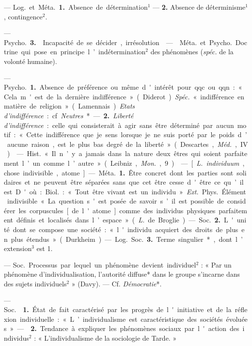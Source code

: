 \begin{itemize}[leftmargin=1cm, label=, itemsep=1pt]
 — \si{Log.} et \si{Méta.} {\bf 1.} Absence de détermination$^1$
—  {\bf 2.} Absence de déterminisme$^1$, contingence$^2$.

— \si{Psycho.} {\bf 3.}  Incapacité de se décider,
irrésolution.

 —  \si{Méta.} et \si{Psycho.} Doctrine qui
pose en principe l’indétermination$^2$ des phénomènes ({\it spéc.} de la
volonté humaine).

 — \si{Psycho.} {\bf 1.} Absence de préférence ou même
d'intérêt pour qqc. ou qqn. : « Cela m'est de la dernière
indifférence » (Diderot). {\it Spéc.} « indifférence en matière de
religion » (Lamennais). {\it Etats d’indifférence} : cf. {\it Neutres}*. —
{\bf 2.} {\it Liberté d'indifférence} : celle qui consisterait à agir sans
être déterminé par aucun motif : « Cette indifférence que je sens lorsque je
ne suis porté... par le poids d’aucune raison, est le plus bas degré de la
liberté » (Descartes, \si{{\it Méd.}}, IV).

 — \si{Hist.} « Il n’y a jamais dans la
nature deux
êtres qui soient parfaitement l’un comme l’autre » (Leibniz, {\it Mon.}, 9).

 — [{\it L.} {\it individuum}, chose indivisible, atome] —
\si{Méta.} {\bf 1.} Être concret dont les parties sont solidaires et ne
peuvent être séparées sans que cet être cesse d'être ce qu’il est. D'où :
\si{Biol.} : « Tout être vivant est un individu ». {\it Ext.} \si{Phys.}
Élément indivisible « La question s'est posée de savoir s’il est possible de
considérer les corpuscules [de l'atome] comme des individus physiques
parfaitement définis et localisés dans l’espace » ({\it L.} de Broglie).

— \si{Soc.} {\bf 2.} L'unité dont se compose une société : « l'individu
acquiert des droits de plus en plus étendus » (Durkheim).

— \si{Log.} \si{Soc.} {\bf 3.} Terme singulier*, dont l’extension$^3$ est
1.

 — \si{Soc.} Processus par lequel un phénomène devient
individuel$^2$ : « Par un phénomène d’individualisation, l'autorité diffuse*
dans le groupe s’incarne dans des sujets individuels$^2$ » (Davy). — Cf.
{\it Démocratie}*.

 — \si{Soc.}  {\bf 1.} État de fait
caractérisé par les progrès de l'initiative et de la réflexion individuelle :
« L’individualisme est caractéristique des sociétés évoluées. » —
 {\bf 2.} Tendance à expliquer les phénomènes sociaux par
l'action des individus$^2$ : « L’individualisme de la sociologie de Tarde. »


\end{itemize}
